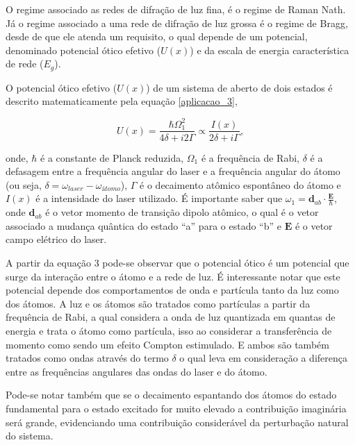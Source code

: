 			\par O regime associado as redes de difração de luz fina, é o regime de Raman Nath. Já o regime associado a uma rede de difração de luz grossa é o regime de Bragg, desde de que ele atenda um requisito, o qual depende de um potencial, denominado potencial ótico efetivo ($U(x)$) e da escala de energia característica de rede ($E_{g}$)\cite{ricardo_5}.
			
			\par O potencial ótico efetivo ($U(x)$) de um sistema de aberto de dois estados é descrito matematicamente pela equação \eqref{aplicacao_3},

			\begin{equation}
				\label{aplicacao_3}
				U(x) = \frac {\hbar \Omega_{1}^2}{4\delta + i2\Gamma}  \propto  \frac {I(x)}{2\delta + i\Gamma},
			\end{equation}

			onde, $\hbar$ é a constante de Planck reduzida, $\Omega_{1}$ é a frequência de Rabi, $\delta$ é a defasagem entre a frequência angular do laser e a frequência angular do átomo (ou seja, $\delta = \omega_{laser} - \omega_{átomo}$), $\Gamma$ é o decaimento atômico espontâneo do átomo e $I(x)$ é a intensidade do laser utilizado. É importante saber que $\omega_{1} = \mathbf{d}_{ab} \cdot \frac{\mathbf{E}}{\hbar}$, onde $\mathbf{d}_{ab}$ é o vetor momento de transição dipolo atômico, o qual é o vetor associado a mudança quântica do estado “a” para o estado “b” e $\mathbf{E}$ é o vetor campo elétrico do laser\cite{ricardo_5}.
			
			\par A partir da equação 3 pode-se observar que o potencial ótico é um potencial que surge da interação entre o átomo e a rede de luz. É interessante notar que este potencial depende dos comportamentos de onda e partícula tanto da luz como dos átomos. A luz e os átomos são tratados como partículas a partir da frequência de Rabi, a qual considera a onda de luz quantizada em quantas de energia e trata o átomo como partícula, isso ao considerar a transferência de momento como sendo um efeito Compton estimulado. E ambos são também tratados como ondas através do termo $\delta$ o qual leva em consideração a diferença entre as frequências angulares das ondas do laser e do átomo.
			
			\par Pode-se notar também que se o decaimento espantando dos átomos do estado fundamental para o estado excitado for muito elevado a contribuição imaginária será grande, evidenciando uma contribuição considerável da perturbação natural do sistema\cite{ricardo_2}.
			
